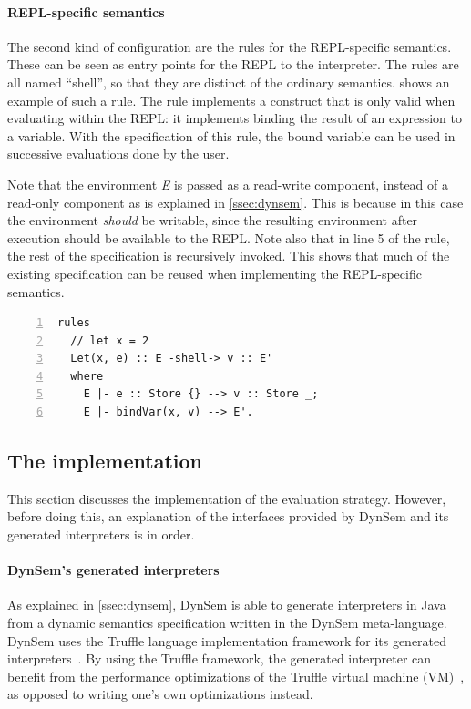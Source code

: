 \paragraph{REPL-specific semantics} The second kind of configuration are the
rules for the REPL-specific semantics. These can be seen as entry points for the
REPL to the interpreter. The rules are all named ``shell'', so that they are
distinct of the ordinary semantics.  shows an example of
such a rule. The rule implements a construct that is only valid when evaluating
within the REPL: it implements binding the result of an expression to a
variable. With the specification of this rule, the bound variable can be used in
successive evaluations done by the user.

Note that the environment \textit{E} is passed as a read-write component,
instead of a read-only component as is explained in \cref{ssec:dynsem}. This is
because in this case the environment \emph{should} be writable, since the
resulting environment after execution should be available to the REPL. Note also
that in line 5 of the rule, the rest of the specification is recursively
invoked. This shows that much of the existing specification can be reused when
implementing the REPL-specific semantics.

\begin{minipage}{\textwidth}
\begin{lstlisting}[language=dynsem,caption={A rule specifying semantics specific
to the REPL.},label={lst:shell-rule},numbers=left]
rules
  // let x = 2
  Let(x, e) :: E -shell-> v :: E'
  where
    E |- e :: Store {} --> v :: Store _;
    E |- bindVar(x, v) --> E'.
\end{lstlisting}
\end{minipage}

\subsection{The implementation}
\label{ssec:implementation}
This section discusses the implementation of the evaluation
strategy. However, before doing this, an explanation of the interfaces provided
by DynSem and its generated interpreters is in order.

\paragraph{DynSem's generated interpreters} As explained in \cref{ssec:dynsem},
DynSem is able to generate interpreters in Java from a dynamic semantics
specification written in the DynSem meta-language. DynSem uses the Truffle
language implementation framework for its generated
interpreters~\cite{Humer14}. By using the Truffle framework, the generated
interpreter can benefit from the performance optimizations of the Truffle
virtual machine (VM)~\cite{Wurthinger13}, as opposed to writing one's own
optimizations instead.

